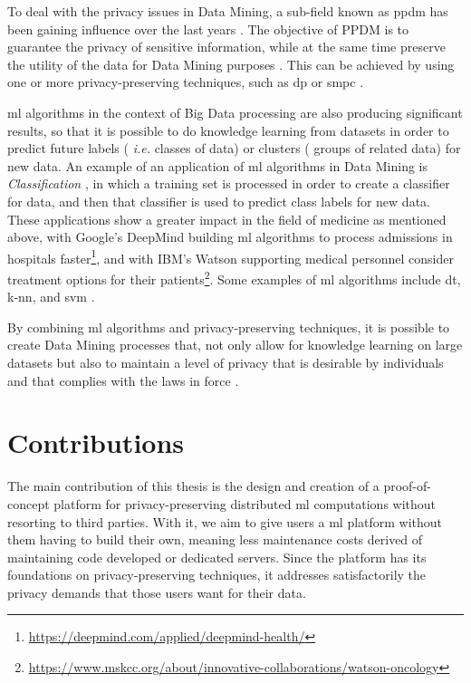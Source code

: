 To deal with the privacy issues in Data Mining, a sub-field known as \ac{ppdm} has been gaining influence over the last years \cite{DAcquisto2015}. The objective of PPDM is to guarantee the privacy of sensitive information, while at the same time preserve the utility of the data for Data Mining purposes \cite{agrawal2000privacy}.
This can be achieved by using one or more privacy-preserving techniques, such as \ac{dp} \cite{Danezis2015} or \ac{smpc} \cite{DAcquisto2015}.


\ac{ml} algorithms in the context of Big Data processing are also producing significant results, so that it is possible to do knowledge learning from datasets in order to predict future labels ( \textit{i.e.} classes of data) or clusters ( groups of related data) for new data. An example of an application of \ac{ml} algorithms in Data Mining is \textit{Classification} \cite{LeiXu2014}, in which a training set is processed in order to create a classifier for data, and then that classifier is used to predict class labels for new data. These applications show a greater impact in the field of medicine as mentioned above, with Google's DeepMind building \ac{ml} algorithms to process admissions in hospitals faster\footnote{\url{https://deepmind.com/applied/deepmind-health/}}, and with IBM's Watson supporting medical personnel consider treatment options for their patients\footnote{\url{https://www.mskcc.org/about/innovative-collaborations/watson-oncology}}.
Some examples of \ac{ml} algorithms include \ac{dt}, \ac{k-nn}, and \ac{svm} \cite{LeiXu2014}.

By combining \ac{ml} algorithms and privacy-preserving techniques, it is possible to create Data Mining processes that, not only allow for knowledge learning on large datasets but also to maintain a level of privacy that is desirable by individuals and that complies with the laws in force \cite{DAcquisto2015}.



\section{Contributions}
\label{sec:Intro_Contributions}

The main contribution of this thesis is the design and creation of a proof-of-concept platform for privacy-preserving distributed \ac{ml} computations without resorting to third parties. With it, we aim to give users a \ac{ml} platform without them having to build their own, meaning less maintenance costs derived of maintaining code developed or dedicated servers. Since the platform has its foundations on privacy-preserving techniques, it addresses satisfactorily the privacy demands that those users want for their data.

